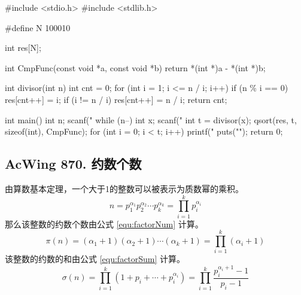 \begin{mycpptwocol}[试除法求约数]
    #include <stdio.h>
    #include <stdlib.h>

    #define N 100010

    int res[N];

    int CmpFunc(const void *a, const void *b) {
        return *(int *)a - *(int *)b;
    }

    int divisor(int n) {
        int cnt = 0;
        for (int i = 1; i <= n / i; i++) {
            if (n \% i == 0) {
                res[cnt++] = i;
                if (i != n / i) {
                    res[cnt++] = n / i;
                }
            }
        }
        return cnt;
    }

    int main() {
        int n;
        scanf("%
        while (n--) {
            int x;
            scanf("%
            int t = divisor(x);
            qsort(res, t, sizeof(int), CmpFunc);
            for (int i = 0; i < t; i++) {
                printf("%
            }
            puts("");
        }
        return 0;
    }
\end{mycpptwocol}

\subsection{AcWing 870. 约数个数}

由算数基本定理，一个大于1的整数可以被表示为质数幂的乘积。
\begin{equation}
    n = p_1^{\alpha_1}p_2^{\alpha_2} \cdots p_k^{\alpha_k}
    = \prod_{i=1}^{k} p_i^{\alpha_i}
\end{equation}
那么该整数的约数个数由公式 \ref{equ:factorNum} 计算。
\begin{equation}
    \label{equ:factorNum}
    \pi(n) = (\alpha_1 + 1)(\alpha_2 + 1) \cdots (\alpha_k + 1)
    = \prod_{i=1}^{k} (\alpha_i + 1)
\end{equation}
该整数的约数的和由公式 \ref{equ:factorSum} 计算。
\begin{equation}
    \label{equ:factorSum}
    \sigma(n) = \prod_{i=1}^{k} (1 + p_i + \cdots + p_i^{\alpha_i})
    = \prod_{i = 1}^k \frac{p_i^{\alpha_i + 1} - 1}{p_i - 1}
\end{equation}

